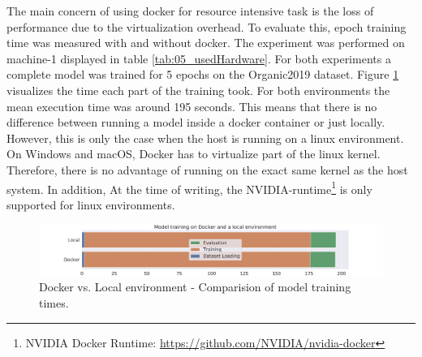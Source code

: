 The main concern of using docker for resource intensive task is the loss of performance due to the virtualization overhead. To evaluate this, epoch training time was measured with and without docker. The experiment was performed on machine-1 displayed in table \ref{tab:05_usedHardware}. For both experiments a complete model was trained for 5 epochs on the Organic2019 dataset. Figure \ref{fig:05_dockerExecution} visualizes the time each part of the training took. For both environments the mean execution time was around 195 seconds. This means that there is no difference between running a model inside a docker container or just locally. However, this is only the case when the host is running on a linux environment. On Windows and macOS, Docker has to virtualize part of the linux kernel. Therefore, there is no advantage of running on the exact same kernel as the host system. In addition, At the time of writing, the NVIDIA-runtime\footnote{NVIDIA Docker Runtime: \hyperlink{https://github.com/NVIDIA/nvidia-docker}{https://github.com/NVIDIA/nvidia-docker}} is only supported for linux environments.

\begin{figure}[ht]
	\centering
	\includegraphics[width=\textwidth]{figures/05_setup/05_dockerExecution}
	\caption{Docker vs. Local environment - Comparision of model training times.}
	\label{fig:05_dockerExecution}
\end{figure}




